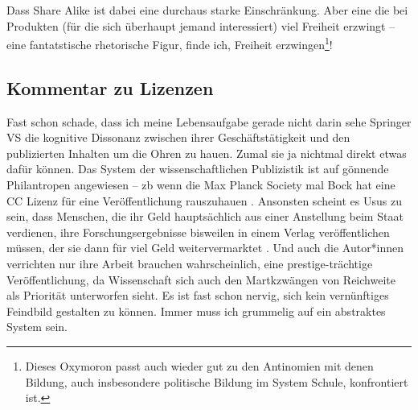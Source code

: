 Dass Share Alike ist dabei eine durchaus starke Einschränkung. Aber eine die bei Produkten (für die sich überhaupt jemand interessiert) viel Freiheit erzwingt -- eine fantatstische rhetorische Figur, finde ich, Freiheit erzwingen\footnote{Dieses Oxymoron passt auch wieder gut zu den Antinomien mit denen Bildung, auch insbesondere politische Bildung im System Schule, konfrontiert ist.}!

\subsection{Kommentar zu Lizenzen}
Fast schon schade, dass ich meine Lebensaufgabe gerade nicht darin sehe Springer VS die kognitive Dissonanz zwischen ihrer Geschäftstätigkeit und den publizierten Inhalten um die Ohren zu hauen. Zumal sie ja nichtmal direkt etwas dafür können. Das System der wissenschaftlichen Publizistik ist auf gönnende Philantropen angewiesen -- \Gls{zb} wenn die Max Planck Society mal Bock hat eine CC Lizenz für eine Veröffentlichung rauszuhauen \autocite[Beispiel von hier:][178, übrigens ohne SA, damit auch die kommerzielle Publizistik Spaß damit haben kann]{Elsasser.2017}. Ansonsten scheint es Usus zu sein, dass Menschen, die ihr Geld hauptsächlich aus einer Anstellung beim Staat verdienen, ihre Forschungsergebnisse bisweilen in einem Verlag veröffentlichen müssen, der sie dann für viel Geld weitervermarktet \autocite[schade, dass sich das wahrscheinlich einige nicht anschauen werden, siw nicht über den akademischen Bereich \gls{oä} Zugang haben. Ist spannend, aber Paywall ftw (e-book {66,99€} am 12.06.2025)]{Schroder.2020}. Und auch die Autor*innen verrichten nur ihre Arbeit brauchen wahrscheinlich, eine prestige-trächtige Veröffentlichung, da Wissenschaft sich auch den Martkzwängen von Reichweite als Priorität unterworfen sieht. Es ist fast schon nervig, sich kein vernünftiges Feindbild gestalten zu können. %
Immer muss ich grummelig auf ein abstraktes System sein. 

